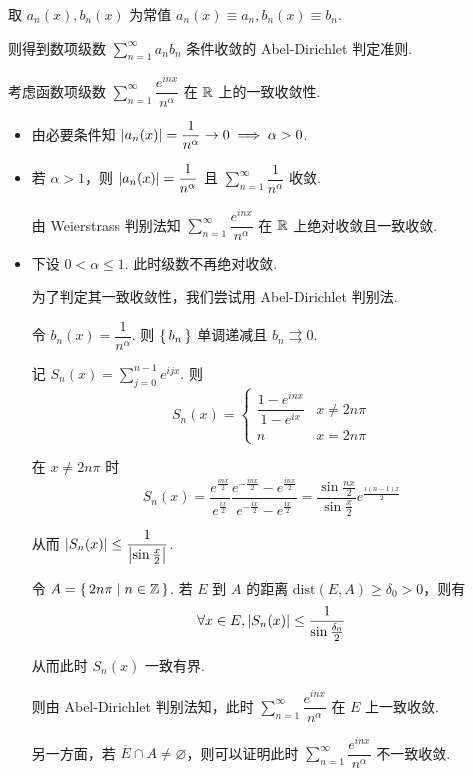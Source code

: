 \begin{hint}
    取 $a_n(x),b_n(x)$ 为常值 $a_n(x)\equiv a_n,b_n(x)\equiv b_n$.
    
    则得到数项级数 $\sum\limits_{n=1}^\infty a_nb_n$ 条件收敛的 Abel-Dirichlet 判定准则.
\end{hint}

\begin{example}
    考虑函数项级数 $\sum\limits_{n=1}^\infty\dfrac{e^{inx}}{n^\alpha}$ 在 $\mathbb{R}$ 上的一致收敛性.

    \begin{itemize}
        \item 由必要条件知 $\left\lvert{a_n(x)}\right\rvert=\dfrac{1}{n^\alpha}\to 0\implies\alpha>0$.
        
        \item 若 $\alpha>1$，则 $\left\lvert{a_n(x)}\right\rvert=\dfrac{1}{n^\alpha}$ 且 $\sum\limits_{n=1}^\infty\dfrac{1}{n^\alpha}$ 收敛.
        
        由 Weierstrass 判别法知 $\sum\limits_{n=1}^\infty\dfrac{e^{inx}}{n^\alpha}$ 在 $\mathbb{R}$ 上绝对收敛且一致收敛.

        \item 下设 $0<\alpha\le 1$. 此时级数不再绝对收敛.
        
        为了判定其一致收敛性，我们尝试用 Abel-Dirichlet 判别法.

        令 $b_n(x)=\dfrac{1}{n^\alpha}$. 则 $\set{b_n}$ 单调递减且 $b_n\rightrightarrows 0$.

        记 $S_n(x)=\sum\limits_{j=0}^{n-1}e^{ijx}$. 则
$$
S_n(x)=\begin{cases}
    \dfrac{1-e^{inx}}{1-e^{ix}} & x\ne 2n\pi\\
    n & x=2n\pi
\end{cases}
$$

        在 $x\ne 2n\pi$ 时
$$
S_n(x)=\frac{e^\frac{inx}{2}}{e^\frac{ix}{2}}\frac{e^{-\frac{inx}{2}}-e^\frac{inx}{2}}{e^{-\frac{ix}{2}}-e^\frac{ix}{2}}=\frac{\sin\frac{nx}{2}}{\sin\frac{x}{2}}e^\frac{i(n-1)x}{2}
$$

        从而 $\left\lvert{S_n(x)}\right\rvert\le\dfrac{1}{\left\lvert{\sin\frac{x}{2}}\right\rvert}$.

        令 $A=\set{2n\pi|n\in\mathbb{Z}}$. 若 $E$ 到 $A$ 的距离 $\mathrm{dist}(E,A)\ge\delta_0>0$，则有
$$
\forall x\in E,\left\lvert{S_n(x)}\right\rvert\le\frac{1}{\sin\frac{\delta_0}{2}}
$$

        从而此时 $S_n(x)$ 一致有界.
        
        则由 Abel-Dirichlet 判别法知，此时 $\sum\limits_{n=1}^\infty\dfrac{e^{inx}}{n^\alpha}$ 在 $E$ 上一致收敛.

        另一方面，若 $\overline{E}\cap A\ne\varnothing$，则可以证明此时 $\sum\limits_{n=1}^\infty\dfrac{e^{inx}}{n^\alpha}$ 不一致收敛.
    \end{itemize}
\end{example}


